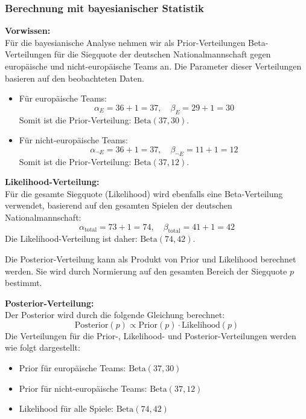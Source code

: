 \documentclass[a4paper,12pt]{article}
\begin{document}
\subsubsection{Berechnung mit bayesianischer Statistik}

\textbf{Vorwissen:} \\
Für die bayesianische Analyse nehmen wir als Prior-Verteilungen Beta-Verteilungen für die Siegquote der deutschen Nationalmannschaft gegen europäische und nicht-europäische Teams an. Die Parameter dieser Verteilungen basieren auf den beobachteten Daten.

\begin{itemize}
  \item Für europäische Teams:
    \[
    \alpha_E = 36 + 1 = 37, \quad \beta_E = 29 + 1 = 30
    \]
    Somit ist die Prior-Verteilung: \( \text{Beta}(37, 30) \).

  \item Für nicht-europäische Teams:
    \[
    \alpha_{\neg E} = 36 + 1 = 37, \quad \beta_{\neg E} = 11 + 1 = 12
    \]
    Somit ist die Prior-Verteilung: \( \text{Beta}(37, 12) \).
\end{itemize}

\textbf{Likelihood-Verteilung:} \\
Für die gesamte Siegquote (Likelihood) wird ebenfalls eine Beta-Verteilung verwendet, basierend auf den gesamten Spielen der deutschen Nationalmannschaft:
\[
\alpha_{\text{total}} = 73 + 1 = 74, \quad \beta_{\text{total}} = 41 + 1 = 42
\]
Die Likelihood-Verteilung ist daher: \( \text{Beta}(74, 42) \).

Die Posterior-Verteilung kann als Produkt von Prior und Likelihood berechnet werden. Sie wird durch Normierung auf den gesamten Bereich der Siegquote \( p \) bestimmt.

\textbf{Posterior-Verteilung:} \\
Der Posterior wird durch die folgende Gleichung berechnet:
\[
\text{Posterior}(p) \propto \text{Prior}(p) \cdot \text{Likelihood}(p)
\]
Die Verteilungen für die Prior-, Likelihood- und Posterior-Verteilungen werden wie folgt dargestellt:

\begin{itemize}
  \item Prior für europäische Teams: \( \text{Beta}(37, 30) \)
  \item Prior für nicht-europäische Teams: \( \text{Beta}(37, 12) \)
  \item Likelihood für alle Spiele: \( \text{Beta}(74, 42) \)
\end{itemize}
\end{document}
